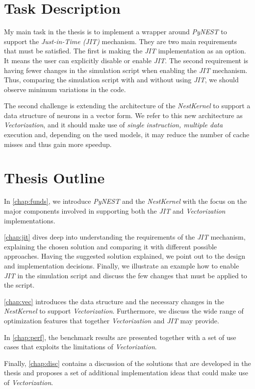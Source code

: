 \section{Task Description}
My main task in the thesis is to implement a wrapper around \emph{PyNEST} to support the \emph{Just-in-Time (JIT)} mechanism. They are two main requirements that must be satisfied. The first is making the \emph{JIT} implementation as an option. It means the user can explicitly disable or enable \emph{JIT}. The second requirement is having fewer changes in the simulation script when enabling the \emph{JIT} mechanism. Thus, comparing the simulation script with and without using \emph{JIT}, we should observe minimum variations in the code.

The second challenge is extending the architecture of the \emph{NestKernel} to support a data structure of neurons in a vector form. We refer to this new architecture as \emph{Vectorization}, and it should make use of \emph{single instruction, multiple data} execution and, depending on the used models, it may reduce the number of cache misses and thus gain more speedup.
\section{Thesis Outline}


In \autoref{chap:funds}, we introduce \emph{PyNEST} and the \emph{NestKernel} with the focus on the major components involved in supporting both the \emph{JIT} and \emph{Vectorization} implementations.

\autoref{chap:jit} dives deep into understanding the requirements of the \emph{JIT} mechanism, explaining the chosen solution and comparing it with different possible approaches. Having the suggested solution explained, we point out to the design and implementation decisions. Finally, we illustrate an example how to enable \emph{JIT} in the simulation script and discuss the few changes that must be applied to the script.

\autoref{chap:vec} introduces the data structure and the necessary changes in the \emph{NestKernel} to support \emph{Vectorization}. Furthermore, we discuss the wide range of optimization features that together \emph{Vectorization} and \emph{JIT} may provide.

In \autoref{chap:perf}, the benchmark results are presented together with a set of use cases that exploits the limitations of \emph{Vectorization}.

Finally, \autoref{chap:disc} contains a discussion of the solutions that are developed in the thesis and proposes a set of additional implementation ideas that could make use of \emph{Vectorization}.



\cleardoublepage